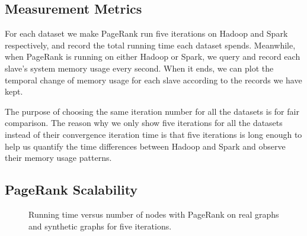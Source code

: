\documentclass[12pt,conference,letterpaper]{IEEEtran}
\begin{document}
\subsection{Measurement Metrics}
For each dataset we make PageRank run five iterations on Hadoop and Spark respectively, and record the total running time each dataset spends. Meanwhile, when PageRank is running on either Hadoop or Spark, we query and record each slave's system memory usage every second. When it ends, we can plot the temporal change of memory usage for each slave according to the records we have kept.

The purpose of choosing the same iteration number for all the datasets is for fair comparison. The reason why we only show five iterations for all the datasets instead of their convergence iteration time is that five iterations is long enough to help us quantify the time differences between Hadoop and Spark and observe their memory usage patterns.



\subsection{PageRank Scalability}

\begin{figure}[!t]
    \centering
    \caption{Running time versus number of nodes with PageRank on real graphs and synthetic graphs for five iterations.}
    \label{fig:time_vs_size}
\end{figure}
\end{document}
